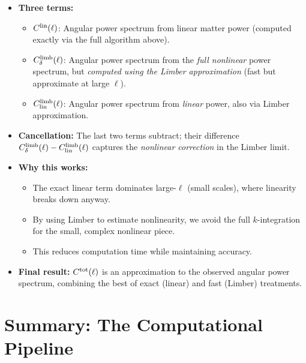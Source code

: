 \begin{itemize}[leftmargin=1.5cm]
    \item \textbf{Three terms:}
    \begin{itemize}
        \item $C^{\rm lin}(\ell)$: Angular power spectrum from linear matter power (computed exactly via the full algorithm above).
        \item $C^{\rm limb}_\delta(\ell)$: Angular power spectrum from the \emph{full nonlinear} power spectrum, but \emph{computed using the Limber approximation} (fast but approximate at large $\ell$).
        \item $C^{\rm limb}_{\rm lin}(\ell)$: Angular power spectrum from \emph{linear} power, also via Limber approximation.
    \end{itemize}

    \item \textbf{Cancellation:} The last two terms subtract; their difference $C^{\rm limb}_\delta(\ell) - C^{\rm limb}_{\rm lin}(\ell)$ captures the \emph{nonlinear correction} in the Limber limit.

    \item \textbf{Why this works:}
    \begin{itemize}
        \item The exact linear term dominates large-$\ell$ (small scales), where linearity breaks down anyway.
        \item By using Limber to estimate nonlinearity, we avoid the full $k$-integration for the small, complex nonlinear piece.
        \item This reduces computation time while maintaining accuracy.
    \end{itemize}

    \item \textbf{Final result:} $C^{\rm tot}(\ell)$ is an approximation to the observed angular power spectrum, combining the best of exact (linear) and fast (Limber) treatments.
\end{itemize}

\section{Summary: The Computational Pipeline}

